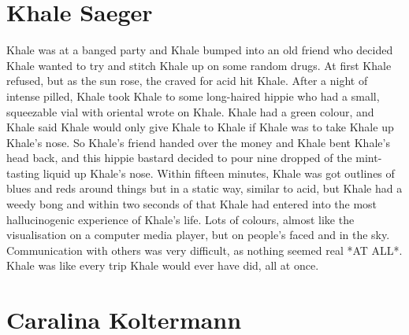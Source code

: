 \documentclass[12pt]{book}
\begin{document}
\chapter{Khale Saeger}




Khale was at a banged party and Khale bumped into an old friend who decided Khale wanted to try and stitch Khale up on some random drugs. At first Khale refused, but as the sun rose, the craved for acid hit Khale. After a night of intense pilled, Khale took Khale to some long-haired hippie who had a small, squeezable vial with oriental wrote on Khale. Khale had a green colour, and Khale said Khale would only give Khale to Khale if Khale was to take Khale up Khale's nose. So Khale's friend handed over the money and Khale bent Khale's head back, and this hippie bastard decided to pour nine dropped of the mint-tasting liquid up Khale's nose. Within fifteen minutes, Khale was got outlines of blues and reds around things but in a static way, similar to acid, but Khale had a weedy bong and within two seconds of that Khale had entered into the most hallucinogenic experience of Khale's life. Lots of colours, almost like the visualisation on a computer media player, but on people's faced and in the sky. Communication with others was very difficult, as nothing seemed real *AT ALL*. Khale was like every trip Khale would ever have did, all at once.



\chapter{Caralina Koltermann}
\end{document}

